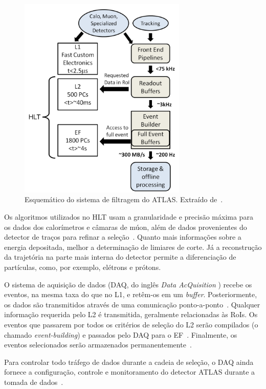 \begin{figure}[htpb!]
    \centering
    \includegraphics[width=8cm]{images/atlas_trigger_system.png}
    \caption[Esquemático do sistema de filtragem do ATLAS.]{Esquemático do
    sistema de filtragem do ATLAS. Extraído de~\cite{ref:2010performance}.}
    \label{fig:triggersystem}
\end{figure}

Os algoritmos utilizados no HLT usam a granularidade e precisão máxima para os
dados dos calorímetros e câmaras de múon, além de dados provenientes do
detector de traços para refinar a seleção~\cite{ATLAS2008}. Quanto mais
informações sobre a energia depositada, melhor a determinação de limiares de
corte. Já a reconstrução da trajetória na parte mais interna do detector
permite a diferenciação de partículas, como, por exemplo, elétrons e prótons.

O sistema de aquisição de dados (DAQ, do inglês \emph{Data AcQuisition} ) recebe
os eventos, na mesma taxa do que no L1, e retêm-os em um \emph{buffer}.
Posteriormente, os dados são transmitidos através de uma comunicação
ponto-a-ponto~\cite{ATLAS2008}.  Qualquer informação requerida pelo L2 é
transmitida, geralmente relacionadas às RoIs. Os eventos que passarem por todos
os critérios de seleção do L2 serão compilados (o chamado \emph{event-building})
e passados pelo DAQ para o EF~\cite{ATLAS2008}. Finalmente, os eventos
selecionados serão armazenados permanentemente~\cite{VAN2009}.

Para controlar todo tráfego de dados durante a cadeia de seleção, o DAQ ainda
fornece a configuração, controle e monitoramento do detector ATLAS durante a
tomada de dados~\cite{ATLAS2008,MIOTTO2010}.

